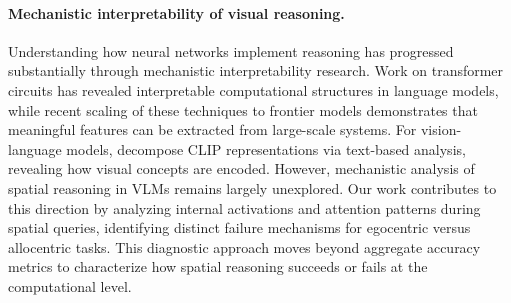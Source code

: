 \paragraph{Mechanistic interpretability of visual reasoning.}
Understanding how neural networks implement reasoning has progressed substantially through mechanistic interpretability research. Work on transformer circuits \cite{elhage2021mathematical, olsson2022context} has revealed interpretable computational structures in language models, while recent scaling of these techniques to frontier models \cite{templeton2024scaling} demonstrates that meaningful features can be extracted from large-scale systems. For vision-language models, \citet{gandelsman2024interpreting} decompose CLIP representations via text-based analysis, revealing how visual concepts are encoded. However, mechanistic analysis of spatial reasoning in VLMs remains largely unexplored. Our work contributes to this direction by analyzing internal activations and attention patterns during spatial queries, identifying distinct failure mechanisms for egocentric versus allocentric tasks. This diagnostic approach moves beyond aggregate accuracy metrics to characterize how spatial reasoning succeeds or fails at the computational level.
